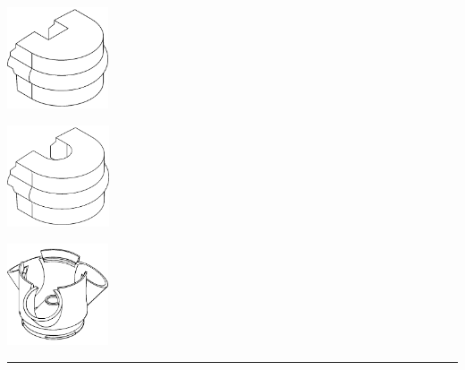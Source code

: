 \begin{center}
    \begin{minipage}{0.3\textwidth}
        \centering
        \includegraphics[height=3cm]{images/wireframes/cable_gland_2wire.png}
    \end{minipage}
    \hfill
    \begin{minipage}{0.3\textwidth}
        \centering
        \includegraphics[height=3cm]{images/wireframes/cable_gland_3wire.png}
    \end{minipage}
    \hfill
    \begin{minipage}{0.3\textwidth}
        \centering
        \includegraphics[height=3cm]{images/wireframes/50mm_base_module.png}
    \end{minipage}

    \vspace{8pt}
    \rule{\textwidth}{0.5pt}
    \vspace{2pt}


\end{center}
